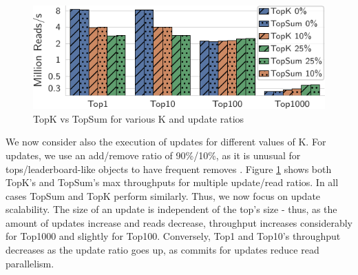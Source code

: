 \documentclass[sigplan,review,anonymous]{acmart}
\begin{document}
\begin{figure}
	\centering
	\includegraphics[width=0.76\linewidth]{singleQuery/topk_vs_topsum_5b}
	\vspace*{-0.6em}
	\caption{TopK vs TopSum for various K and update ratios}
	\label{fig:topKVSTopSum}
	\vspace*{-0.75em}
\end{figure}

We now consider also the execution of updates for different values of K.
For updates, we use an add/remove ratio of 90\%/10\%, as it is unusual for tops/leaderboard-like objects to have frequent removes \cite{Cabrita17Nonuniform}.
Figure \ref{fig:topKVSTopSum} shows both TopK's and TopSum's max throughputs for multiple update/read ratios.
In all cases TopSum and TopK perform similarly.
Thus, we now focus on update scalability.
The size of an update is independent of the top's size - thus, as the amount of updates increase and reads decrease, throughput increases considerably for Top1000 and slightly for Top100.
Conversely, Top1 and Top10's throughput decreases as the update ratio goes up, %
as commits for updates reduce read parallelism.
\end{document}
